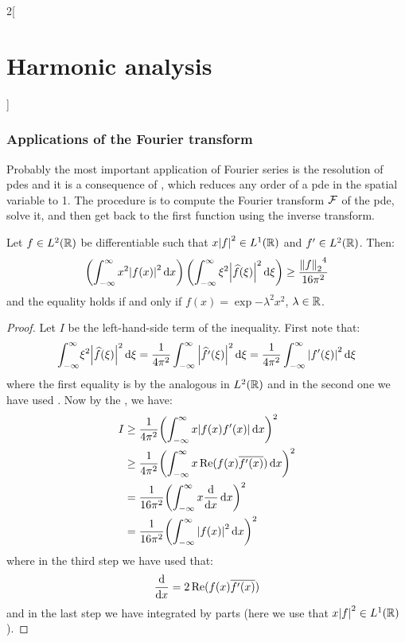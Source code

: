 \documentclass[../../../main_math.tex]{subfiles}
\begin{document}
\begin{multicols}{2}[\section{Harmonic analysis}]
  \subsubsection{Applications of the Fourier transform}
  \begin{remark}
    Probably the most important application of Fourier series is the resolution of pdes and it is a consequence of , which reduces any order of a pde in the spatial variable to 1. The procedure is to compute the Fourier transform $\mathcal{F}$ of the pde, solve it, and then get back to the first function using the inverse transform.
  \end{remark}
  \begin{theorem}
    Let $f\in L^2(\mathbb{R})$ be differentiable such that $x\abs{f}^2\in L^1(\mathbb{R})$ and $f'\in L^2(\mathbb{R})$. Then:
    $$\left(\int_{-\infty}^\infty x^2 \abs{f(x)}^2\dd{x}\right)\left(\int_{-\infty}^\infty \xi^2 \abs{\widehat{f}(\xi)}^2\dd{\xi}\right)\geq \frac{{\left\|f\right\|_2}^4}{16\pi^2}$$
    and the equality holds if and only if $f(x)=\exp{-\lambda^2x^2}$, $\lambda\in\mathbb{R}$.
  \end{theorem}
  \begin{proof}
    Let $I$ be the left-hand-side term of the inequality. First note that:
    $$\int_{-\infty}^\infty \!\xi^2 \abs{\widehat{f}(\xi)}^2\dd{\xi}=\frac{1}{4\pi^2}\int_{-\infty}^\infty \abs{\widehat{f'}(\xi)}^2\dd{\xi}=\frac{1}{4\pi^2}\int_{-\infty}^\infty \abs{{f'}(\xi)}^2\dd{\xi}$$
    where the first equality is by the analogous  in $L^2(\mathbb{R})$ and in the second one we have used .
    Now by the , we have:
    \begin{align*}
      I & \geq \frac{1}{4\pi^2}{\left(\int_{-\infty}^\infty x\abs{f(x){f'}(x)}\dd{x}\right)}^2         \\
        & \geq \frac{1}{4\pi^2}{\left(\int_{-\infty}^\infty x\Re(f(x)\overline{f'(x)})\dd{x}\right)}^2 \\
        & = \frac{1}{16\pi^2}{\left(\int_{-\infty}^\infty x\dv{}{x}(\abs{f(x)}^2)\dd{x}\right)}^2      \\
        & = \frac{1}{16\pi^2}{\left(\int_{-\infty}^\infty \abs{f(x)}^2\dd{x}\right)}^2                 \\
    \end{align*}
    where in the third step we have used that:
    $$\dv{}{x}(\abs{f(x)}^2)=2\Re(f(x)\overline{f'(x)})$$
    and in the last step we have integrated by parts (here we use that $x\abs{f}^2\in L^1(\mathbb{R})$).

\end{proof}
\end{multicols}
\end{document}
